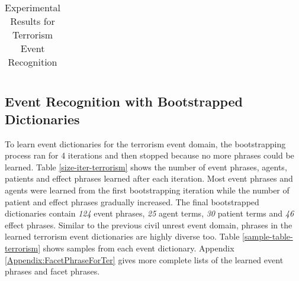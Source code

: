 \begin{table}[ht]
\begin{tabular}[center]{|lccc|}
\end{tabular}
\caption{Experimental Results for Terrorism Event Recognition}
\label{facet-results-table-terrorism}
\end{table}

\subsection{Event Recognition with Bootstrapped Dictionaries}

To learn event dictionaries for the terrorism event domain, 
the bootstrapping process ran for 4 iterations and then 
stopped because no more phrases could be learned. 
Table \ref{size-iter-terrorism} shows the number of 
event phrases, agents, patients and effect phrases 
learned after each iteration. 
Most event phrases and agents were learned from the first 
bootstrapping iteration while the number of patient and effect phrases 
gradually 
increased. 
The final
bootstrapped dictionaries contain {\it 124} event phrases, {\it 25}
agent terms, {\it 30} patient terms and {\it 46} effect phrases. 
Similar to the previous civil unrest event domain, 
phrases in the learned terrorism event dictionaries are highly diverse too. 
Table \ref{sample-table-terrorism} shows samples from each event dictionary.
Appendix \ref{Appendix:FacetPhraseForTer} gives more complete lists of 
the learned event phrases and facet phrases.

